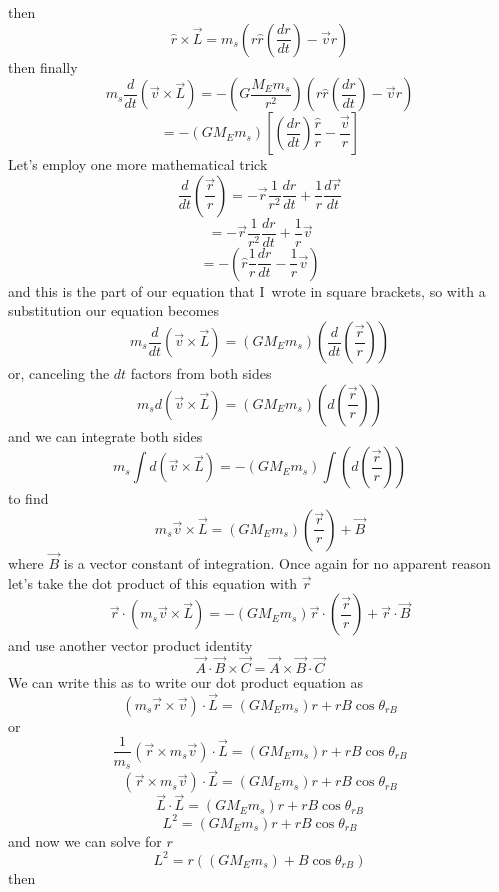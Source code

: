 then 
$$\hat{r}\times \overrightarrow{L}=m_{s}\left( r\hat{r}\left( \frac{dr}{dt}\right) -\overrightarrow{v}r\right) $$
then finally 
$$ m_{s}\frac{d}{dt}\left( \overrightarrow{v}\times \overrightarrow{L}\right)=-\left( G\frac{M_{E}m_{s}}{r^{2}}\right) \left( r\hat{r}\left( \frac{dr}{dt}\right) -\overrightarrow{v}r\right) 
$$
$$=-\left( GM_{E}m_{s}\right) \left[ \left( \frac{dr}{dt}\right) \frac{\hat{r}}{r}-\frac{\overrightarrow{v}}{r}\right] $$
Let's employ one more mathematical trick
$$\frac{d}{dt}\left( \frac{\overrightarrow{r}}{r}\right) =-\overrightarrow{r} \frac{1}{r^{2}}\frac{dr}{dt}+\frac{1}{r}\frac{d\overrightarrow{r}}{dt}
$$
$$=-\overrightarrow{r}\frac{1}{r^{2}}\frac{dr}{dt}+\frac{1}{r}\overrightarrow{v}
$$
$$=-\left( \hat{r}\frac{1}{r}\frac{dr}{dt}-\frac{1}{r}\overrightarrow{v}\right)$$
and this is the part of our equation that I\ wrote in square brackets, so with a substitution our equation becomes
$$m_{s}\frac{d}{dt}\left( \overrightarrow{v}\times \overrightarrow{L}\right)=\left( GM_{E}m_{s}\right) \left( \frac{d}{dt}\left( \frac{\overrightarrow{r}}{r}\right) \right) $$
or, canceling the $dt$ factors from both sides
$$m_{s}d\left( \overrightarrow{v}\times \overrightarrow{L}\right) =\left(GM_{E}m_{s}\right) \left( d\left( \frac{\overrightarrow{r}}{r}\right)\right)
$$
and we can integrate both sides
$$m_{s}\int d\left( \overrightarrow{v}\times \overrightarrow{L}\right)=-\left( GM_{E}m_{s}\right) \int \left( d\left( \frac{\overrightarrow{r}}{r}\right) \right)
$$
to find 
$$m_{s}\overrightarrow{v}\times \overrightarrow{L}=\left( GM_{E}m_{s}\right)\left( \frac{\overrightarrow{r}}{r}\right) +\overrightarrow{B}
$$
where $\overrightarrow{B}$ is a vector constant of integration. Once again for no apparent reason let's take the dot product of this equation with $\overrightarrow{r}$
$$\overrightarrow{r}\cdot \left( m_{s}\overrightarrow{v}\times \overrightarrow{L}\right) =-\left( GM_{E}m_{s}\right) \overrightarrow{r}\cdot \left( \frac{\overrightarrow{r}}{r}\right) +\overrightarrow{r}\cdot \overrightarrow{B} 
$$
and use another vector product identity
$$\overrightarrow{A}\cdot \overrightarrow{B}\times \overrightarrow{C}=\overrightarrow{A}\times \overrightarrow{B}\cdot \overrightarrow{C} 
$$
We can write this as to write our dot product equation as 
$$\left( m_{s}\overrightarrow{r}\times \overrightarrow{v}\right) \cdot \overrightarrow{L}=\left( GM_{E}m_{s}\right) r+rB\cos \theta _{rB} 
$$
or
$$\frac{1}{m_{s}}\left( \overrightarrow{r}\times m_{s}\overrightarrow{v}\right) \cdot \overrightarrow{L}=\left( GM_{E}m_{s}\right) r+rB\cos \theta_{rB}
$$
$$\left( \overrightarrow{r}\times m_{s}\overrightarrow{v}\right) \cdot \overrightarrow{L}=\left( GM_{E}m_{s}\right) r+rB\cos \theta _{rB} 
$$
$$\overrightarrow{L}\cdot \overrightarrow{L}=\left( GM_{E}m_{s}\right)r+rB\cos \theta _{rB} 
$$
$$L^{2}=\left( GM_{E}m_{s}\right) r+rB\cos \theta _{rB} 
$$
and now we can solve for $r$
$$L^{2}=r\left( \left( GM_{E}m_{s}\right) +B\cos \theta _{rB}\right) 
$$
then 

